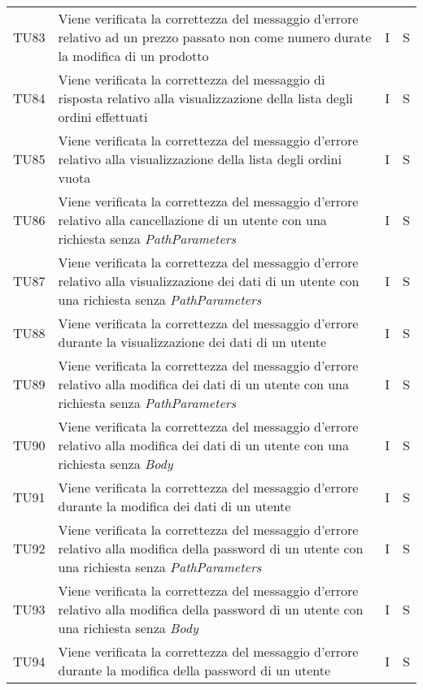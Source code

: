 {\begin{longtable}{C{2cm} C{9.6cm} C{1.5cm} C{1cm}}
TU83 & Viene verificata la correttezza del messaggio d'errore relativo ad un prezzo passato non come numero durate la modifica di un prodotto & I & S\\

TU84 & Viene verificata la correttezza del messaggio di risposta relativo alla visualizzazione della lista degli ordini effettuati & I & S\\

TU85 & Viene verificata la correttezza del messaggio d'errore relativo alla visualizzazione della lista degli ordini vuota & I & S\\

TU86 & Viene verificata la correttezza del messaggio d'errore relativo alla cancellazione di un utente con una richiesta senza \textit{PathParameters} & I & S\\

TU87 & Viene verificata la correttezza del messaggio d'errore relativo alla visualizzazione dei dati di un utente con una richiesta senza \textit{PathParameters} & I & S\\

TU88 & Viene verificata la correttezza del messaggio d'errore durante la visualizzazione dei dati di un utente & I & S\\

TU89 & Viene verificata la correttezza del messaggio d'errore relativo alla modifica dei dati di un utente con una richiesta senza \textit{PathParameters} & I & S\\

TU90 & Viene verificata la correttezza del messaggio d'errore relativo alla modifica dei dati di un utente con una richiesta senza \textit{Body} & I & S\\

TU91 & Viene verificata la correttezza del messaggio d'errore durante la modifica dei dati di un utente & I & S\\

TU92 & Viene verificata la correttezza del messaggio d'errore relativo alla modifica della password di un utente con una richiesta senza \textit{PathParameters} & I & S\\

TU93 & Viene verificata la correttezza del messaggio d'errore relativo alla modifica della password di un utente con una richiesta senza \textit{Body} & I & S\\

TU94 & Viene verificata la correttezza del messaggio d'errore durante la modifica della password di un utente & I & S\\


\end{longtable}}
